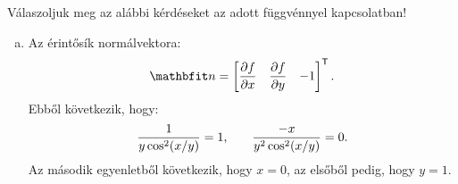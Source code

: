 \begin{exercise}{
    Válaszoljuk meg az alábbi kérdéseket az adott függvénnyel kapcsolatban!
  }
{\begin{enumerate}[a)]
\[\begin{bmatrix}
            \end{bmatrix}^{\mathsf T}
            \begin{bmatrix}
              3/5 \\ -4/5
            \end{bmatrix}
            = \frac{3 + 4\pi}{5}
            \text.
          \]
          Az érintő egyenlete ezek alapján:
          \[
            \frac{x - \pi}{3/5} = \frac{y - 1}{-4/5} = \frac{z - 0}{(3 + 4\pi)/5}
            \text.
          \]
    \item Az érintősík normálvektora:
          \[
            \rvec n = \begin{bmatrix}
              \displaystyle\pdv{f}{x} & \displaystyle\pdv{f}{y} & -1
            \end{bmatrix}^{\mathsf T}
            \text.
          \]
          Ebből következik, hogy:
          \[
            \dfrac{1}{y \cos^2(x / y)} = 1
            \text,\qquad
            \dfrac{-x}{y^2 \cos^2(x / y)} = 0
            \text.
          \]
          Az második egyenletből következik, hogy $x = 0$, az elsőből pedig,
          hogy $y = 1$.
  \end{enumerate}
  }
\end{exercise}
